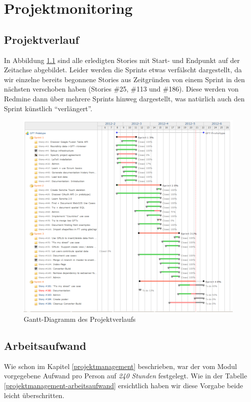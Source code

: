 \chapter{Projektmonitoring}
\label{projektmonitoring}

\section{Projektverlauf}
In Abbildung \ref{overall_stories_gantt_chart} sind alle erledigten Stories mit Start- und Endpunkt auf der Zeitachse abgebildet. Leider werden die Sprints etwas verfälscht dargestellt, da wir einzelne bereits begonnene Stories aus Zeitgründen von einem Sprint in den nächsten verschoben haben (Stories \#25, \#113 und \#186). Diese werden von Redmine dann über mehrere Sprints hinweg dargestellt, was natürlich auch den Sprint künstlich "`verlängert"'.

\begin{figure}[H]
	\centering
	\includegraphics[width=\textwidth]{images/projektmanagement/overall_stories_gantt_chart}
	\caption{Gantt-Diagramm des Projektverlaufs}
	\label{overall_stories_gantt_chart}
\end{figure}

\section{Arbeitsaufwand}
Wie schon im Kapitel \ref{projektmanagement} beschrieben, war der vom Modul vorgegebene Aufwand pro Person auf \emph{240 Stunden} festgelegt. Wie in der Tabelle \ref{projektmanagement-arbeitsaufwand} ersichtlich haben wir diese Vorgabe beide leicht überschritten.

